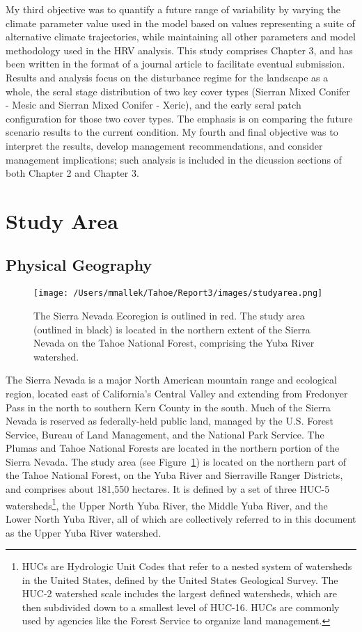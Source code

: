 My third objective was to quantify a future range of variability by varying the climate parameter value used in the model based on values representing a suite of alternative climate trajectories, while maintaining all other parameters and model methodology used in the HRV analysis. This study comprises Chapter 3, and has been written in the format of a journal article to facilitate eventual submission. Results and analysis focus on the disturbance regime for the landscape as a whole, the seral stage distribution of two key cover types (Sierran Mixed Conifer - Mesic and Sierran Mixed Conifer - Xeric), and the early seral patch configuration for those two cover types. The emphasis is on comparing the future scenario results to the current condition. My fourth and final objective was to interpret the results, develop management recommendations, and consider management implications; such analysis is included in the dicussion sections of both Chapter 2 and Chapter 3.


\section{Study Area}

\subsection{Physical Geography}

\begin{figure}[!htbp]
\texttt{[image: /Users/mmallek/Tahoe/Report3/images/studyarea.png]}
\caption{The Sierra Nevada Ecoregion is outlined in red. The study area (outlined in black) is located in the northern extent of the Sierra Nevada on the Tahoe National Forest, comprising the Yuba River watershed.}
\label{projectarea}
\end{figure}

The Sierra Nevada is a major North American mountain range and ecological region, located east of California's Central Valley and extending from Fredonyer Pass in the north to southern Kern County in the south. Much of the Sierra Nevada is reserved as federally-held public land, managed by the U.S. Forest Service, Bureau of Land Management, and the National Park Service. The Plumas and Tahoe National Forests are located in the northern portion of the Sierra Nevada. The study area (see Figure~\ref{projectarea}) is located on the northern part of the Tahoe National Forest, on the Yuba River and Sierraville Ranger Districts, and comprises about 181,550 hectares. It is defined by a set of three HUC-5 watersheds\footnote{HUCs are Hydrologic Unit Codes that refer to a nested system of watersheds in the United States, defined by the United States Geological Survey. The HUC-2 watershed scale includes the largest defined watersheds, which are then subdivided down to a smallest level of HUC-16. HUCs are commonly used by agencies like the Forest Service to organize land management.}, the Upper North Yuba River, the Middle Yuba River, and the Lower North Yuba River, all of which are collectively referred to in this document as the Upper Yuba River watershed. 

